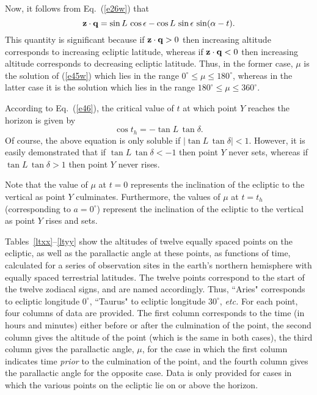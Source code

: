 Now, it follows from Eq.~(\ref{e26w}) that
\begin{equation}
{\bf z}\cdot{\bf q} = \sin L\,\cos\epsilon - \cos L\,\sin\epsilon\,\sin(\alpha-t).
\end{equation}
This quantity is significant because if ${\bf z}\cdot{\bf q} > 0$ then increasing altitude corresponds to increasing
ecliptic latitude, whereas if ${\bf z}\cdot{\bf q} <0$ then increasing altitude corresponds to decreasing
ecliptic latitude. Thus, in the former case, $\mu$ is the solution of (\ref{e45w}) which lies in the range
$0^\circ\leq \mu\leq 180^\circ$, whereas in the latter case it is the solution which lies in the range
$180^\circ\leq \mu\leq 360^\circ$. 

According to Eq.~(\ref{e46}), the critical value of $t$ at which point $Y$ reaches the horizon is given by
\begin{equation}
\cos t_h = - \tan L\,\tan\delta.
\end{equation}
Of course, the above equation is only soluble if $|\tan L\,\tan\delta|<1$.
However, it is easily demonstrated that if $\tan L\,\tan\delta < -1$ then point $Y$ never sets, whereas
if $\tan L\,\tan\delta > 1$ then point $Y$ never rises.

Note that the value of $\mu$ at $t=0$ represents the inclination of the ecliptic to the vertical as point $Y$
culminates. 
Furthermore, the values of $\mu$ at $t=t_h$ (corresponding to $a=0^\circ$) represent  the inclination of the ecliptic to the 
vertical as point $Y$
rises and sets. 

Tables~\ref{ltxx}--\ref{ltyy} show the altitudes of twelve equally spaced points on the
ecliptic, as well as the
parallactic angle at these points, as functions of
time, calculated for a series of observation sites in the earth's northern hemisphere with
equally spaced terrestrial latitudes. The twelve points correspond to the
start of the twelve zodiacal signs, and are named accordingly. Thus,
``Aries" corresponds to ecliptic longitude $0^\circ$, ``Taurus" to ecliptic
longitude $30^\circ$, {\em etc.} For each point, four columns of
data are provided. The first column corresponds to the time  (in hours
and minutes) either before or after the culmination of the point, the
second column gives the altitude of the point (which is the same
in both cases), the third column gives the parallactic angle, $\mu$, for the case in which
the first column indicates time
{\em prior}\/ to the culmination of the point, and the fourth column gives the parallactic angle 
for the opposite case.  Data
is only provided for cases in which the various points on the ecliptic lie on
or above the horizon.


